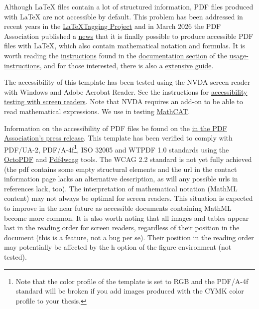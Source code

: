 \documentclass[english, manual, a4paper]{csthesis}
\begin{document}
Although \LaTeX{} files contain a lot of structured information, PDF files produced with \LaTeX{} are not  accessible by default. This problem has been addressed in recent years in the \href{https://latex3.github.io/tagging-project/}{\LaTeX Tagging Project}
and in March 2026 the PDF Association published a \href{https://pdfa.org/accessible-math-in-pdf-finally/}{news} that it is finally possible to produce accessible PDF files with LaTeX, which also contain mathematical notation and formulas. It is worth reading the \href{https://latex3.github.io/tagging-project/documentation/}{instructions} found in the \href{https://latex3.github.io/tagging-project/documentation/}{documentation section} of the \href{https://latex3.github.io/tagging-project/documentation/}{usage-instructions}, 
and for those interested, there is also a \href{https://latex3.github.io/tagging-project/documentation/wtpdf/fulldoc}{extensive guide}.

The accessibility of this template has been tested using the NVDA screen reader with Windows and Adobe Acrobat Reader. See the instructions for \href{https://helpdesk.it.helsinki.fi/en/instructions/other-instructions/accessibility-testing-screen-readers}{accessibility testing with screen readers}. Note that NVDA requires an add-on to be able to read mathematical expressions. We use in testing \href{https://addons.nvda-project.org/addons/MathCAT.en.html}{MathCAT}.

Information on the accessibility of PDF files be found on the \href{https://pdfa.org/accessible-math-in-pdf-finally/}{in the PDF Association's press release}. This template has been verified to comply with PDF/UA-2, PDF/A-4f\footnote{Note that the color profile of the template is set to RGB and the PDF/A-4f standard will be broken if you add images produced with the CYMK color profile to your thesis.}, ISO 32005 and WTPDF 1.0
standards using the \href{https://octopdf.com}{OctoPDF} and \href{https://pdf4wcag.com}{Pdf4wcag} tools. The WCAG 2.2 standard is not yet fully achieved (the pdf contains some empty structural elements and the url in the contact information page lacks an alternative description, as will any possible urls in references lack, too). The interpretation of mathematical notation (MathML content) may not always be optimal for screen readers. This situation is expected to improve in the near future as accessible documents containing MathML become more common. It is also worth noting that all images and tables appear last in the reading order for screen readers, regardless of their position in the document (this is a feature, not a bug per se). Their position in the reading order may potentially be affected by the h option of the figure environment (not tested).
\end{document}
